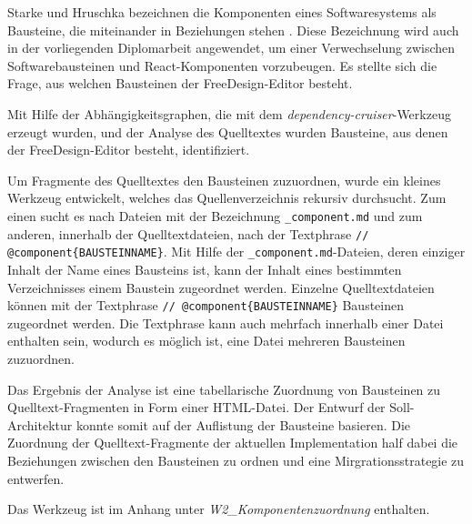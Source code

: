 
Starke und Hruschka bezeichnen die Komponenten eines Softwaresystems als Bausteine, die miteinander in Beziehungen stehen \autocite[vgl.][24]{Starke2011}. Diese Bezeichnung wird auch in der vorliegenden Diplomarbeit angewendet, um einer Verwechselung zwischen Softwarebausteinen und React-Komponenten vorzubeugen.
Es stellte sich die Frage, aus welchen Bausteinen der FreeDesign-Editor besteht.  

Mit Hilfe der Abhängigkeitsgraphen, die mit dem \emph{dependency-cruiser}-Werkzeug erzeugt wurden, und der Analyse des Quelltextes wurden Bausteine, aus denen der FreeDesign-Editor besteht, identifiziert. 

Um Fragmente des Quelltextes den Bausteinen zuzuordnen, wurde ein kleines Werkzeug entwickelt, welches das Quellenverzeichnis rekursiv durchsucht. Zum einen sucht es nach Dateien mit der Bezeichnung \glqq\lstinline|_component.md|\grqq{} und zum anderen, innerhalb der Quelltextdateien, nach der Textphrase \glqq\lstinline|// @component{BAUSTEINNAME}|\grqq{}. 
Mit Hilfe der \lstinline|_component.md|-Dateien, deren einziger Inhalt der Name eines Bausteins ist, kann der Inhalt eines bestimmten Verzeichnisses einem Baustein zugeordnet werden. Einzelne Quelltextdateien können mit der Textphrase \glqq\lstinline|// @component{BAUSTEINNAME}|\grqq{} Bausteinen zugeordnet werden. Die Textphrase kann auch mehrfach innerhalb einer Datei enthalten sein, wodurch es möglich ist, eine Datei mehreren Bausteinen zuzuordnen. 

Das Ergebnis der Analyse ist eine tabellarische Zuordnung von Bausteinen zu Quelltext-Fragmenten in Form einer HTML-Datei. 
Der Entwurf der Soll-Architektur konnte somit auf der Auflistung der Bausteine basieren. Die Zuordnung der Quelltext-Fragmente der aktuellen Implementation half dabei die Beziehungen zwischen den Bausteinen zu ordnen und eine Mirgrationsstrategie zu entwerfen.

Das Werkzeug ist im Anhang unter \emph{W2\_Komponentenzuordnung} enthalten.